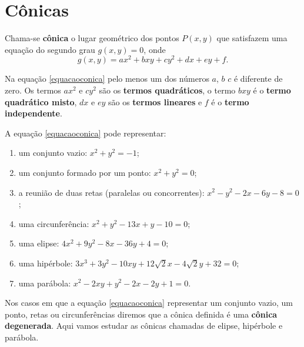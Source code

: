
\section{C\^onicas} %
\label{sec:conicas}

\begin{definicao}
  Chama-se \textbf{c\^onica} o lugar geom\'etrico dos pontos $P(x,y)$ que satisfazem uma equa\c{c}\~ao do segundo grau $g(x,y) = 0$, onde
  \begin{equation}\label{equacaoconica}
    g(x,y) = ax^2 + bxy + cy^2 + dx + ey + f.
  \end{equation}
\end{definicao}

Na equa\c{c}\~ao \eqref{equacaoconica} pelo menos um dos n\'umeros $a$, $b$ $c$ \'e diferente de zero. Os termos $ax^2$ e $cy^2$ s\~ao os \textbf{termos quadr\'aticos}, o termo $bxy$ \'e o \textbf{termo quadr\'atico misto}, $dx$ e $ey$ s\~ao os \textbf{termos lineares} e $f$ \'e o \textbf{termo independente}.    

A equa\c{c}\~ao \eqref{equacaoconica} pode representar:
\begin{enumerate}[label=({\arabic*})]
  \item um conjunto vazio: $x^2 + y^2 = -1$;
  \item um conjunto formado por um ponto: $x^2 + y^2 = 0$;
  \item a reuni\~ao de duas retas (paralelas ou concorrentes): $x^2 - y^2 - 2x - 6y -8 =0$;
  \item uma circunfer\^encia: $x^2 + y^2 - 13x + y - 10 = 0$;
  \item uma elipse: $4x^2 + 9y^2 - 8x - 36y + 4 = 0$;
  \item uma hip\'erbole: $3x^3 + 3y^2 - 10xy + 12\sqrt{2}x - 4\sqrt{2}y + 32 = 0$;
  \item uma par\'abola: $x^2 - 2xy + y^2 -2x - 2y + 1 = 0$.
\end{enumerate}

Nos casos em que a equa\c{c}\~ao \eqref{equacaoconica} representar um conjunto vazio, um ponto, retas ou circunfer\^encias diremos que a c\^onica definida \'e uma \textbf{c\^onica degenerada}. Aqui vamos estudar as c\^onicas chamadas de elipse, hip\'erbole e par\'abola.

